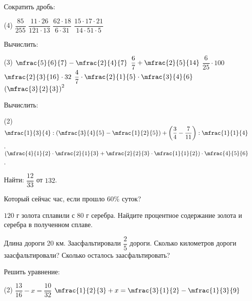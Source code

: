 \begin{homework}[number=2]
	\begin{listofex}
		\item Сократить дробь:
		\begin{tasks}(4)
			\task \( \dfrac{85}{255} \)
			\task \( \dfrac{11\cdot26}{121\cdot13} \)
			\task \( \dfrac{62\cdot18}{6\cdot31} \)
			\task \( \dfrac{15\cdot17\cdot21}{14\cdot51\cdot5} \)
		\end{tasks}
		\item Вычислить:
		\begin{tasks}(3)
			\task \( \mfrac{5}{6}{7}-\mfrac{2}{4}{7} \)
			\task \( \dfrac{6}{7}+\mfrac{2}{5}{14} \)
			\task \( \dfrac{6}{25}\cdot100 \)
			\task \( \mfrac{2}{3}{16}\cdot32 \)
			\task \( \dfrac{4}{7}\cdot\mfrac{2}{1}{5}\cdot\mfrac{3}{4}{6}\)
			\task \( \left( \mfrac{3}{2}{3} \right)^2 \)
		\end{tasks}
		\item Вычислить:
		\begin{tasks}(2)
			\task \( \mfrac{1}{3}{4}:\left( \mfrac{3}{4}{5}-\mfrac{1}{2}{5} \right)+\left( \dfrac{3}{4}-\dfrac{7}{11} \right):\mfrac{1}{1}{4} \).
			\task \( \left( \mfrac{4}{1}{2}\cdot\mfrac{2}{1}{3}+\mfrac{2}{2}{3}\cdot\mfrac{1}{1}{2} \right)\cdot\mfrac{4}{5}{6} \).
		\end{tasks}
		\item Найти: \( \dfrac{12}{33} \) от \( 132 \).
		\item Который сейчас час, если прошло  \( 60\% \) суток?
		\item \(120\) г золота сплавили с \(80\) г серебра. Найдите процентное содержание золота и серебра в полученном сплаве.
		\item Длина дороги 20 км. Заасфальтировали \( \dfrac{2}{5} \) дороги. Сколько километров дороги заасфальтировали? Сколько осталось заасфальтировать?
		\item Решить уравнение:
		\begin{tasks}(2)
			\task \( \dfrac{13}{16}-x=\dfrac{10}{32} \)
			\task \( \mfrac{1}{2}{3}+x=\mfrac{3}{1}{2}-\mfrac{1}{3}{9} \)
		\end{tasks}
	\end{listofex}
\end{homework}
%
%
